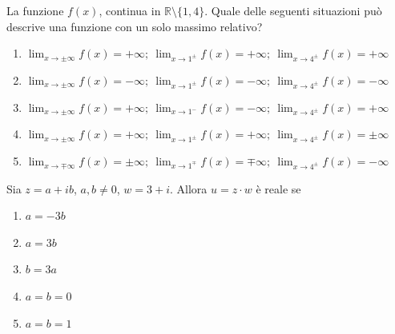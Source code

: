 \begin{quiz}
La funzione $f(x)$, continua in $\mathbb R\setminus\{1,4\}$. Quale delle seguenti situazioni può descrive una funzione con un solo massimo relativo?

\begin{enumerate}
\item $\lim_{x\to\pm\infty}f(x)=+\infty;\ \lim_{x\to1^\pm}f(x)=+\infty;\ \lim_{x\to4^\pm}f(x)=+\infty$
\item $\lim_{x\to\pm\infty}f(x)=-\infty;\ \lim_{x\to1^\pm}f(x)=-\infty;\ \lim_{x\to4^\pm}f(x)=-\infty$
\item $\lim_{x\to\pm\infty}f(x)=+\infty;\ \lim_{x\to1^-}f(x)=-\infty;\ \lim_{x\to4^\pm}f(x)=+\infty$
\item $\lim_{x\to\pm\infty}f(x)=+\infty;\ \lim_{x\to1^\pm}f(x)=+\infty;\ \lim_{x\to4^\pm}f(x)=\pm\infty$
\item $\lim_{x\to\mp\infty}f(x)=\pm\infty;\ \lim_{x\to1^\mp}f(x)=\mp\infty;\ \lim_{x\to4^\pm}f(x)=-\infty$
\end{enumerate}
\end{quiz}

\begin{quiz}
Sia $z=a+ib$, $a,b\ne0$, $w=3+i$. Allora $u=z\cdot w$ è reale se

\begin{enumerate}
\item $a=-3b$
\item $a=3b$
\item $b=3a$
\item $a=b=0$
\item $a=b=1$
\end{enumerate}
\end{quiz}


